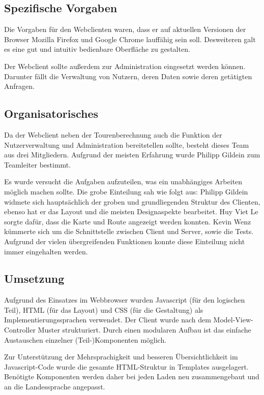 \subsection*{Spezifische Vorgaben}

Die Vorgaben für den Webclienten waren, dass er auf aktuellen Versionen der Browser Mozilla Firefox und Google Chrome lauffähig sein soll.
Desweiteren galt es eine gut und intuitiv bedienbare Oberfläche zu gestalten.

Der Webclient sollte außerdem zur Administration eingesetzt werden können.
Darunter fällt die Verwaltung von Nutzern, deren Daten sowie deren getätigten Anfragen.

\subsection*{Organisatorisches}

Da der Webclient neben der Tourenberechnung auch die Funktion der Nutzerverwaltung und Administration bereitstellen sollte, besteht dieses Team  aus drei Mitgliedern. 
Aufgrund der meisten Erfahrung wurde Philipp Gildein zum Teamleiter bestimmt.

Es wurde versucht die Aufgaben aufzuteilen, was ein unabhängiges Arbeiten möglich machen sollte.
Die grobe Einteilung sah wie folgt aus: Philipp Gildein widmete sich hauptsächlich der groben und grundliegenden Struktur des Clienten, ebenso hat er das Layout und die meisten Designaspekte bearbeitet.
Huy Viet Le sorgte dafür, dass die Karte und Route angezeigt werden konnten.
Kevin Wenz kümmerte sich um die Schnittstelle zwischen Client und Server, sowie die Tests.
Aufgrund der vielen übergreifenden Funktionen konnte diese Einteilung nicht immer eingehalten werden.

\subsection*{Umsetzung}

Aufgrund des Einsatzes im Webbrowser wurden Javascript (für den logischen Teil), HTML (für das Layout) und CSS (für die Gestaltung) als Implementierungssprachen verwendet.
Der Client wurde nach dem Model-View-Controller Muster strukturiert.
Durch einen modularen Aufbau ist das einfache Austauschen einzelner (Teil-)Komponenten möglich.

Zur Unterstützung der Mehrsprachigkeit und besseren Übersichtlichkeit im Javascript-Code wurde die gesamte HTML-Struktur in Templates ausgelagert.
Benötigte Komponenten werden daher bei jeden Laden neu zusammengebaut und an die Landessprache angepasst.


